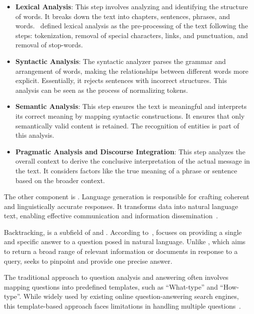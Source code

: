 \begin{itemize}
    \item \textbf{Lexical Analysis}: This step involves analyzing and identifying the structure of words. It breaks down the text into chapters, sentences, phrases, and words.~\citet{chizhik_challenges_2020} defined lexical analysis as the pre-processing of the text following the steps: tokenization, removal of special characters, links, and punctuation, and removal of stop-words.

    \item \textbf{Syntactic Analysis}: The syntactic analyzer parses the grammar and arrangement of words, making the relationships between different words more explicit. Essentially, it rejects sentences with incorrect structures. This analysis can be seen as the process of normalizing tokens.

    \item \textbf{Semantic Analysis}: This step ensures the text is meaningful and interprets its correct meaning by mapping syntactic constructions. It ensures that only semantically valid content is retained. The recognition of entities is part of this analysis.

    \item \textbf{Pragmatic Analysis and Discourse Integration}: This step analyzes the overall context to derive the conclusive interpretation of the actual message in the text. It considers factors like the true meaning of a phrase or sentence based on the broader context.
\end{itemize}

The other component is \textbf{{\nlg}}. Language generation is responsible for crafting coherent and linguistically accurate responses. It transforms data into natural language text, enabling effective communication and information dissemination~\cite{ngai_intelligent_2021}. 

Backtracking, {\qa} is a subfield of {\ir} and {\nlp}. According to~\citet{zhong_building_2020}, {\qa} focuses on providing a single and specific answer to a question posed in natural language. Unlike {\ir}, which aims to return a broad range of relevant information or documents in response to a query, {\qa} seeks to pinpoint and provide one precise answer.

The traditional approach to question analysis and answering often involves mapping questions into predefined templates, such as ``What-type'' and ``How-type''. While widely used by existing online question-answering search engines, this template-based approach faces limitations in handling multiple questions~\cite{zhong_building_2020}. 

